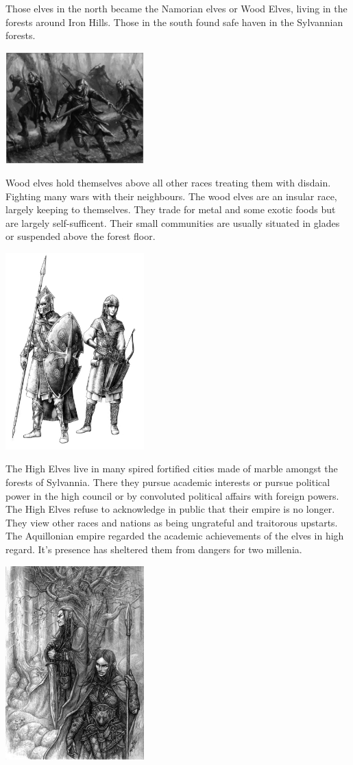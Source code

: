 \documentclass[a4paper]{dnd5}
\begin{document}
Those elves in the north became the Namorian elves or Wood Elves, living in the forests around Iron Hills.  Those in the south found safe haven in the Sylvannian forests. 

 \includegraphics[width=0.4\textwidth]{wood_elf.jpg}

Wood elves hold themselves above all other races treating them with disdain.  Fighting many wars with their neighbours.  The wood elves are an insular race, largely keeping to themselves.  They trade for metal and some exotic foods but are largely self-sufficent.  Their small communities are usually situated in glades or suspended above the forest floor.  

 \includegraphics[width=0.4\textwidth]{high_elves.png}

The High Elves  live in many spired fortified cities made of marble amongst the forests of Sylvannia.  There they pursue academic interests or pursue political power in the high council or by convoluted political affairs with foreign powers.  The High Elves refuse to acknowledge in public that their empire is no longer.  They view other races and nations as being ungrateful and traitorous upstarts.  The Aquillonian empire regarded the academic achievements of the elves in high regard.  It's presence has sheltered them from dangers for two millenia.

 \includegraphics[width=0.4\textwidth]{dark_elf_raiders.jpg}
\end{document}
